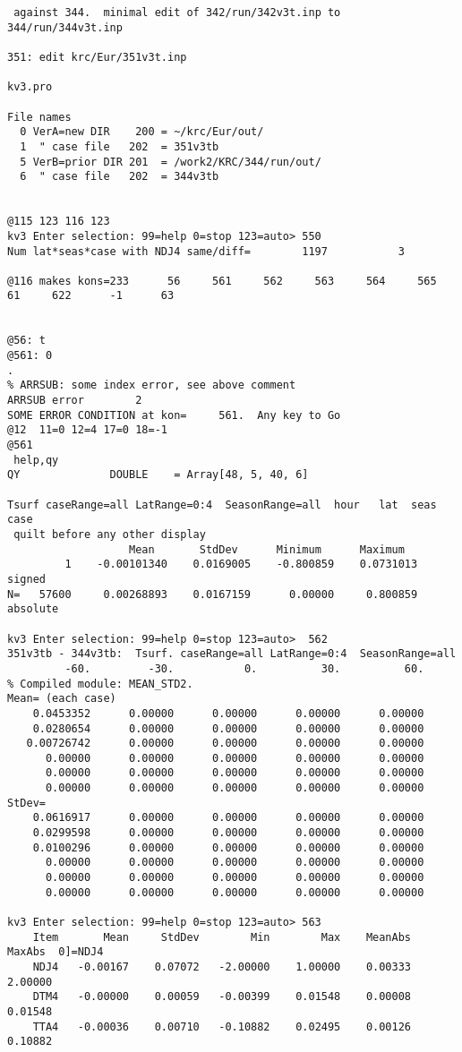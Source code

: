 \documentclass{article}
\begin{document}
\begin{verbatim}
 against 344.  minimal edit of 342/run/342v3t.inp to 344/run/344v3t.inp
 
351: edit krc/Eur/351v3t.inp

kv3.pro 

File names
  0 VerA=new DIR    200 = ~/krc/Eur/out/
  1  " case file   202  = 351v3tb
  5 VerB=prior DIR 201  = /work2/KRC/344/run/out/
  6  " case file   202  = 344v3tb


@115 123 116 123
kv3 Enter selection: 99=help 0=stop 123=auto> 550
Num lat*seas*case with NDJ4 same/diff=        1197           3

@116 makes kons=233      56     561     562     563     564     565      61     622      -1      63


@56: t
@561: 0
.
% ARRSUB: some index error, see above comment
ARRSUB error        2
SOME ERROR CONDITION at kon=     561.  Any key to Go
@12  11=0 12=4 17=0 18=-1
@561
 help,qy
QY              DOUBLE    = Array[48, 5, 40, 6]

Tsurf caseRange=all LatRange=0:4  SeasonRange=all  hour   lat  seas  case
 quilt before any other display
                   Mean       StdDev      Minimum      Maximum
         1    -0.00101340    0.0169005    -0.800859    0.0731013  signed
N=   57600     0.00268893    0.0167159      0.00000     0.800859  absolute

kv3 Enter selection: 99=help 0=stop 123=auto>  562
351v3tb - 344v3tb:  Tsurf. caseRange=all LatRange=0:4  SeasonRange=all
         -60.         -30.           0.          30.          60.
% Compiled module: MEAN_STD2.
Mean= (each case)
    0.0453352      0.00000      0.00000      0.00000      0.00000
    0.0280654      0.00000      0.00000      0.00000      0.00000
   0.00726742      0.00000      0.00000      0.00000      0.00000
      0.00000      0.00000      0.00000      0.00000      0.00000
      0.00000      0.00000      0.00000      0.00000      0.00000
      0.00000      0.00000      0.00000      0.00000      0.00000
StDev=
    0.0616917      0.00000      0.00000      0.00000      0.00000
    0.0299598      0.00000      0.00000      0.00000      0.00000
    0.0100296      0.00000      0.00000      0.00000      0.00000
      0.00000      0.00000      0.00000      0.00000      0.00000
      0.00000      0.00000      0.00000      0.00000      0.00000
      0.00000      0.00000      0.00000      0.00000      0.00000

kv3 Enter selection: 99=help 0=stop 123=auto> 563
    Item       Mean     StdDev        Min        Max    MeanAbs     MaxAbs  0]=NDJ4
    NDJ4   -0.00167    0.07072   -2.00000    1.00000    0.00333    2.00000
    DTM4   -0.00000    0.00059   -0.00399    0.01548    0.00008    0.01548
    TTA4   -0.00036    0.00710   -0.10882    0.02495    0.00126    0.10882


\end{verbatim}
\end{document}
